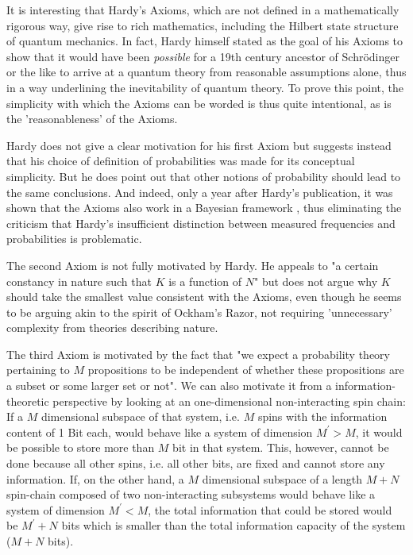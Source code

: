\documentclass[11pt, a4paper]{article}
\begin{document}
\vspace{8pt}
It is interesting that Hardy's Axioms, which are not defined in a mathematically rigorous way, give rise to rich mathematics, including the Hilbert state structure of quantum mechanics. In fact, Hardy himself stated as the goal of his Axioms to show that it would have been \emph{possible} for a 19th century ancestor of Schrödinger or the like to arrive at a quantum theory from reasonable assumptions alone, thus in a way underlining the inevitability of quantum theory. To prove this point, the simplicity with which the Axioms can be worded is thus quite intentional, as is the 'reasonableness' of the Axioms.\par
Hardy does not give a clear motivation for his first Axiom but suggests instead that his choice of definition of probabilities was made for its conceptual simplicity. But he does point out that other notions of probability should lead to the same conclusions. And indeed, only a year after Hardy's publication, it was shown that the Axioms also work in a Bayesian framework \cite{Schack_2003}, thus eliminating the criticism that Hardy's insufficient distinction between measured frequencies and probabilities is problematic.\par
The second Axiom is not fully motivated by Hardy. He appeals to "a certain constancy in nature such that $K$ is a function of $N$" but does not argue why $K$ should take the smallest value consistent with the Axioms, even though he seems to be arguing akin to the spirit of Ockham's Razor, not requiring 'unnecessary' complexity from theories describing nature.\par
The third Axiom is motivated by the fact that "we expect a probability theory pertaining to $M$ propositions to be independent of whether these propositions are a subset or some larger set or not". We can also motivate it from a information-theoretic perspective by looking at an one-dimensional non-interacting spin chain: If a $M$ dimensional subspace of that system, i.e. $M$ spins with the information content of 1 Bit each, would behave like a system of dimension $M^\prime >M$, it would be possible to store more than $M$ bit in that system. This, however, cannot be done because all other spins, i.e. all other bits, are fixed and cannot store any information. If, on the other hand, a $M$ dimensional subspace of a length $M+N$ spin-chain composed of two non-interacting subsystems would behave like a system of dimension $M^\prime < M$, the total information that could be stored would be $M^\prime+N$ bits which is smaller than the total information capacity of the system ($M+N$ bits).\par
\end{document}
